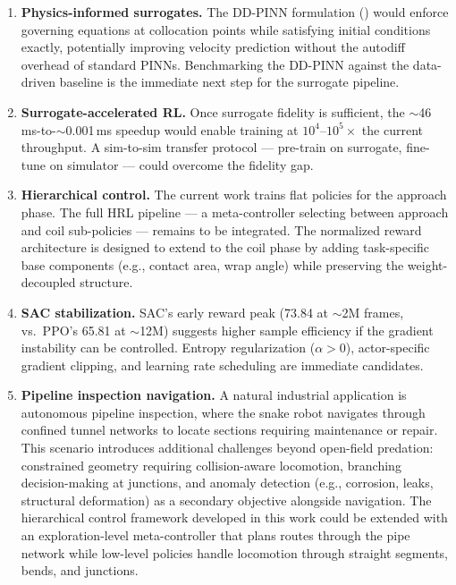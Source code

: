 \documentclass[11pt]{article}
\begin{document}
\begin{enumerate}
  \item \textbf{Physics-informed surrogates.}
  The DD-PINN formulation () would enforce governing equations at collocation points while satisfying initial conditions exactly, potentially improving velocity prediction without the autodiff overhead of standard PINNs.
  Benchmarking the DD-PINN against the data-driven baseline is the immediate next step for the surrogate pipeline.

  \item \textbf{Surrogate-accelerated RL.}
  Once surrogate fidelity is sufficient, the ${\sim}$46\,ms-to-${\sim}$0.001\,ms speedup would enable training at $10^4$--$10^5 \times$ the current throughput.
  A sim-to-sim transfer protocol --- pre-train on surrogate, fine-tune on simulator --- could overcome the fidelity gap.

  \item \textbf{Hierarchical control.}
  The current work trains flat policies for the approach phase.
  The full HRL pipeline --- a meta-controller selecting between approach and coil sub-policies --- remains to be integrated.
  The normalized reward architecture is designed to extend to the coil phase by adding task-specific base components (e.g., contact area, wrap angle) while preserving the weight-decoupled structure.

  \item \textbf{SAC stabilization.}
  SAC's early reward peak (73.84 at ${\sim}$2M frames, vs.\ PPO's 65.81 at ${\sim}$12M) suggests higher sample efficiency if the gradient instability can be controlled.
  Entropy regularization ($\alpha > 0$), actor-specific gradient clipping, and learning rate scheduling are immediate candidates.

  \item \textbf{Pipeline inspection navigation.}
  A natural industrial application is autonomous pipeline inspection, where the snake robot navigates through confined tunnel networks to locate sections requiring maintenance or repair.
  This scenario introduces additional challenges beyond open-field predation: constrained geometry requiring collision-aware locomotion, branching decision-making at junctions, and anomaly detection (e.g., corrosion, leaks, structural deformation) as a secondary objective alongside navigation.
  The hierarchical control framework developed in this work could be extended with an exploration-level meta-controller that plans routes through the pipe network while low-level policies handle locomotion through straight segments, bends, and junctions.
\end{enumerate}
\end{document}
